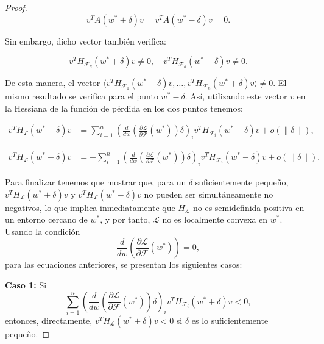 \begin{proof}
    \[
        v^T A( w^* + \delta)  v =  v^T A( w^* - \delta)  v = 0.
    \]

    Sin embargo, dicho vector también verifica:

    \[
        v^T H_{\mathcal{F}_k}( w^* + \delta)  v \neq 0, \quad  v^T H_{\mathcal{F}_k}( w^* - \delta)  v \neq 0.
    \]\newline

    De esta manera, el vector $ \langle v^T H_{\mathcal{F}_1}( w^*+\delta)  v, \dots,  v^T H_{\mathcal{F}_n}( w^*+\delta)  v \rangle \neq 0$. El mismo resultado se verifica para el punto $w^* - \delta$. Así, utilizando este vector $v$ en la Hessiana de la función de pérdida en los dos puntos tenemos:

    \begin{align}
        v^T H_{\mathcal{L}}( w^* + \delta)v &=  
        \sum_{i=1}^{n} \left( \frac{d}{d w} \left( \frac{\partial \mathcal{L}}{\partial \mathcal{F}}( w^*) \right) \delta \right)_i v^T H_{\mathcal{F}_i}( w^* + \delta) v + o(\|\delta\|),
    \end{align}

    \begin{align}
        v^T H_{\mathcal{L}}( w^* - \delta)v &=  
        - \sum_{i=1}^{n} \left( \frac{d}{d w} \left( \frac{\partial \mathcal{L}}{\partial \mathcal{F}}( w^*) \right) \delta \right)_i v^T H_{\mathcal{F}_i}( w^* - \delta) v + o(\|\delta\|).
    \end{align}

    Para finalizar tenemos que mostrar que, para un $\delta$ suficientemente pequeño, $v^T H_{\mathcal{L}}(w^* + \delta) v$ y $v^T H_{\mathcal{L}}(w^* - \delta) v$ no pueden ser simultáneamente no negativos, lo que implica inmediatamente que $H_{\mathcal{L}}$ no es semidefinida positiva en un entorno cercano de $w^*$, y por tanto, $\mathcal{L}$ no es localmente convexa en $w^*$. Usando la condición 
    \[
    \frac{d}{dw} (\frac{\partial \mathcal{L}}{\partial \mathcal{F}}(w^*)) = 0,
    \]
    para las ecuaciones anteriores, se presentan los siguientes casos:\newline

    \textbf{Caso 1:} Si 
    \[
    \sum_{i=1}^{n} \left( \frac{d}{dw} (\frac{\partial \mathcal{L}}{\partial \mathcal{F}}(w^*))\delta \right)_i v^T H_{\mathcal{F}_i}(w^* + \delta) v < 0,
    \]
    entonces, directamente, $v^T H_{\mathcal{L}}(w^* + \delta) v < 0$ si $\delta$ es lo suficientemente pequeño.\newline


\end{proof}
